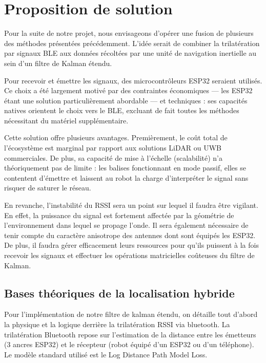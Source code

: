 \documentclass[11pt, a4paper]{article}
\begin{document}
\section{Proposition de solution}

Pour la suite de notre projet, nous envisageons d’opérer une fusion de plusieurs des méthodes présentées précédemment. L’idée serait de combiner la trilatération par signaux BLE aux données récoltées par une unité de navigation inertielle au sein d’un filtre de Kalman étendu.

Pour recevoir et émettre les signaux, des microcontrôleurs ESP32 seraient utilisés. Ce choix a été largement motivé par des contraintes économiques — les ESP32 étant une solution particulièrement abordable — et techniques : ses capacités natives orientent le choix vers le BLE, excluant de fait toutes les méthodes nécessitant du matériel supplémentaire.

Cette solution offre plusieurs avantages. Premièrement, le coût total de l’écosystème est marginal par rapport aux solutions LiDAR ou UWB commerciales. De plus, sa capacité de mise à l’échelle (scalabilité) n’a théoriquement pas de limite : les balises fonctionnant en mode passif, elles se contentent d’émettre et laissent au robot la charge d’interpréter le signal sans risquer de saturer le réseau.

En revanche, l’instabilité du RSSI sera un point sur lequel il faudra être vigilant. En effet, la puissance du signal est fortement affectée par la géométrie de l’environnement dans lequel se propage l’onde. Il sera également nécessaire de tenir compte du caractère anisotrope des antennes dont sont équipés les ESP32. De plus, il faudra gérer efficacement leurs ressources pour qu’ils puissent à la fois recevoir les signaux et effectuer les opérations matricielles coûteuses du filtre de Kalman.

\subsection{Bases théoriques de la localisation hybride}

Pour l’implémentation de notre filtre de kalman étendu, on détaille tout d’abord la physique et la logique derrière la trilatération RSSI via bluetooth. La trilatération Bluetooth repose sur l'estimation de la distance entre les émetteurs (3 ancres ESP32) et le récepteur (robot équipé d’un ESP32 ou d’un téléphone). Le modèle standard utilisé est le Log Distance Path Model Loss.
\end{document}
